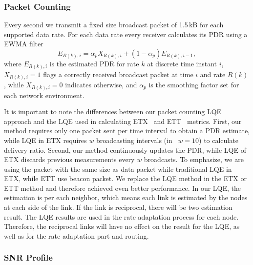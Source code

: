 \documentclass[11pt,draftclsnofoot,journal,onecolumn]{IEEEtran}
\begin{document}
\subsubsection{Packet Counting}
\label{sec:packet_counting}

Every second we transmit a fixed size broadcast packet of 1.5\,kB for each supported data rate. For each data rate every receiver calculates its PDR using a EWMA filter
\begin{equation}
E_{R(k),i}=\alpha_p X_{R(k),i}+(1-\alpha_p)E_{R(k),i-1},
\label{eq:eirkp}
\end{equation}
where $E_{R(k),i}$ is the estimated PDR for rate $k$ at discrete time instant $i$, $X_{R(k),i}=1$ flags a correctly received broadcast packet at time $i$ and rate $R(k)$, while $X_{R(k),i}=0$ indicates otherwise, and $\alpha_p$ is the smoothing factor set for each network environment.

It is important to note the differences between our packet counting LQE approach and the LQE used in calculating ETX~\cite[Eq. (1)]{Couto_WN_2005} and ETT~\cite{BicketMobicom2005} metrics. First, our method requires only one packet sent per time interval to obtain a PDR estimate, while LQE in ETX requires $w$ broadcasting intervals (in~\cite{Couto_WN_2005,BicketMobicom2005} $w=10$) to calculate delivery ratio. Second, our method continuously updates the PDR, while LQE of ETX discards previous measurements every $w$ broadcasts. To emphasize, we are using the packet with the same size as data packet while traditional LQE in ETX, while ETT use beacon packet. We replace the LQE method in the ETX or ETT method and therefore achieved even better performance. In our LQE, the estimation is per each neighbor, which means each link is estimated by the nodes at each side of the link. If the link is reciprocal, there will be two estimation result. The LQE results are used in the rate adaptation process for each node. Therefore, the reciprocal links will have no effect on the result for the LQE, as well as for the rate adaptation part and routing. 

\subsubsection{SNR Profile}
\label{sec:snr_profile}
\end{document}
